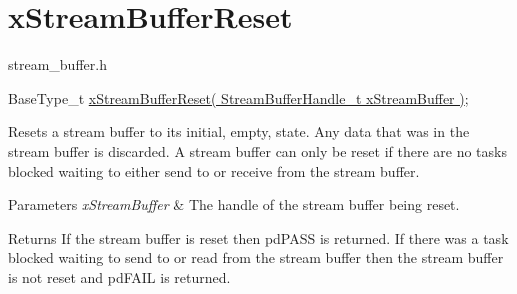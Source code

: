 \hypertarget{group__xStreamBufferReset}{}\section{x\+Stream\+Buffer\+Reset}
\label{group__xStreamBufferReset}
stream\+\_\+buffer.\+h


\begin{DoxyPre}
BaseType\_t \hyperlink{stream__buffer_8h_a5253429645c67902c2fc8682f8af0aac}{xStreamBufferReset( StreamBufferHandle\_t xStreamBuffer )};
\end{DoxyPre}


Resets a stream buffer to its initial, empty, state. Any data that was in the stream buffer is discarded. A stream buffer can only be reset if there are no tasks blocked waiting to either send to or receive from the stream buffer.


\begin{DoxyParams}{Parameters}
{\em x\+Stream\+Buffer} & The handle of the stream buffer being reset.\\
\hline
\end{DoxyParams}
\begin{DoxyReturn}{Returns}
If the stream buffer is reset then pd\+P\+A\+SS is returned. If there was a task blocked waiting to send to or read from the stream buffer then the stream buffer is not reset and pd\+F\+A\+IL is returned. 
\end{DoxyReturn}

